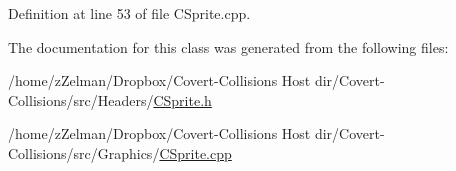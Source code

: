 Definition at line 53 of file C\-Sprite.\-cpp.



The documentation for this class was generated from the following files\-:\begin{DoxyCompactItemize}
\item 
/home/z\-Zelman/\-Dropbox/\-Covert-\/\-Collisions Host dir/\-Covert-\/\-Collisions/src/\-Headers/\hyperlink{CSprite_8h}{C\-Sprite.\-h}\item 
/home/z\-Zelman/\-Dropbox/\-Covert-\/\-Collisions Host dir/\-Covert-\/\-Collisions/src/\-Graphics/\hyperlink{CSprite_8cpp}{C\-Sprite.\-cpp}\end{DoxyCompactItemize}
